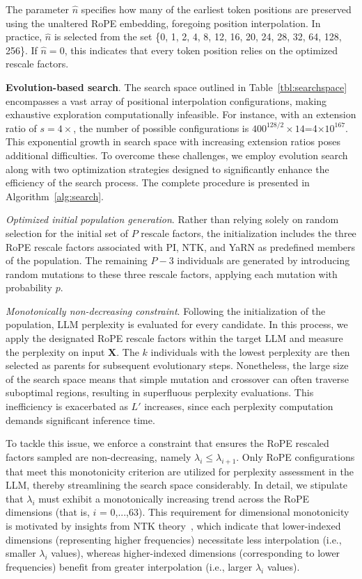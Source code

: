 The parameter $\hat{n}$ specifies how many of the earliest token positions are preserved using the unaltered RoPE embedding, foregoing position interpolation. In practice, $\hat{n}$ is selected from the set \{0, 1, 2, 4, 8, 12, 16, 20, 24, 28, 32, 64, 128, 256\}. If $\hat{n}=0$, this indicates that every token position relies on the optimized rescale factors.

\textbf{Evolution-based search}. The search space outlined in Table~\ref{tbl:searchspace} encompasses a vast array of positional interpolation configurations, making exhaustive exploration computationally infeasible. For instance, with an extension ratio of $s=4\times$, the number of possible configurations is $400^{128/2}\times14$=4$\times10^{167}$. This exponential growth in search space with increasing extension ratios poses additional difficulties. To overcome these challenges, we employ evolution search~\cite{guo2020single} along with two optimization strategies designed to significantly enhance the efficiency of the search process. The complete procedure is presented in Algorithm~\ref{alg:search}.

\textit{Optimized initial population generation}. Rather than relying solely on random selection for the initial set of $P$ rescale factors, the initialization includes the three RoPE rescale factors associated with PI, NTK, and YaRN as predefined members of the population. The remaining $P-3$ individuals are generated by introducing random mutations to these three rescale factors, applying each mutation with probability $p$.

\textit{Monotonically non-decreasing constraint}. Following the initialization of the population, LLM perplexity is evaluated for every candidate. In this process, we apply the designated RoPE rescale factors within the target LLM and measure the perplexity on input $\mathbf{X}$. The $k$ individuals with the lowest perplexity are then selected as parents for subsequent evolutionary steps. Nonetheless, the large size of the search space means that simple mutation and crossover can often traverse suboptimal regions, resulting in superfluous perplexity evaluations. This inefficiency is exacerbated as $L'$ increases, since each perplexity computation demands significant inference time.

To tackle this issue, we enforce a constraint that ensures the RoPE rescaled factors sampled are non-decreasing, namely $\lambda_i \le \lambda_{i+1}$. Only RoPE configurations that meet this monotonicity criterion are utilized for perplexity assessment in the LLM, thereby streamlining the search space considerably. In detail, we stipulate that $\lambda_i$ must exhibit a monotonically increasing trend across the RoPE dimensions (that is, $i$ = 0,...,63). This requirement for dimensional monotonicity is motivated by insights from NTK theory~\cite{jacot2018neural,tancik2020fourier,ntk}, which indicate that lower-indexed dimensions (representing higher frequencies) necessitate less interpolation (i.e., smaller $\lambda_i$ values), whereas higher-indexed dimensions (corresponding to lower frequencies) benefit from greater interpolation (i.e., larger $\lambda_i$ values).

